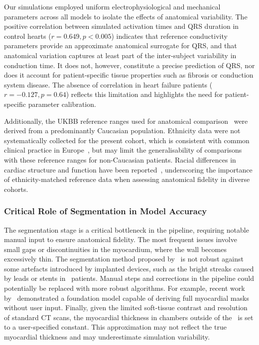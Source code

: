 Our simulations employed uniform electrophysiological and 
mechanical parameters across all models to isolate the effects of anatomical 
variability. The positive correlation between simulated activation times and 
QRS duration in control hearts ($r=0.649, p<0.005$) indicates that reference 
conductivity parameters provide an approximate anatomical surrogate for QRS, 
and that anatomical variation captures at least part of the inter-subject 
variability in conduction time. It does not, however, constitute a precise 
prediction of QRS, nor does it account for patient-specific tissue properties 
such as fibrosis or conduction system disease. The absence of correlation in 
heart failure patients ($r=-0.127, p=0.64$) reflects this limitation and 
highlights the need for patient-specific parameter calibration.

Additionally, the UKBB reference ranges used for anatomical 
comparison~\cite{petersen-2017-reference} were derived from a predominantly 
Caucasian population. Ethnicity data were not systematically collected for the 
present cohort, which is consistent with common clinical practice in 
Europe~\cite{reporting_ethnicity_2004}, but may limit the generalisability of 
comparisons with these reference ranges for non-Caucasian patients. Racial 
differences in cardiac structure and function have been 
reported~\cite{effect_on_race_2019}, underscoring the importance of 
ethnicity-matched reference data when assessing anatomical fidelity in 
diverse cohorts.

\subsubsection{Critical Role of Segmentation in Model Accuracy}
The segmentation stage is a critical bottleneck in the pipeline,
requiring notable manual input to ensure anatomical fidelity.
The most frequent issues involve small gaps or discontinuities in the myocardium, 
where the wall becomes excessively thin.
The segmentation method proposed by~\cite{hao2021_ccta} is not robust against some artefacts
introduced by implanted devices, such as the bright streaks caused by leads or stents in \HF\ patients. 
Manual steps and corrections in the pipeline could potentially be replaced with more 
robust algorithms. 
For example, recent work by~\cite{qayyum-2025-foundationmodel} demonstrated a 
foundation model capable of deriving full myocardial masks without user input.
Finally, given the limited soft-tissue contrast and resolution of standard CT scans, 
the myocardial thickness in chambers outside of the \LV\ is set to a user-specified constant.
This approximation may not reflect the true myocardial thickness 
and may underestimate simulation variability.

